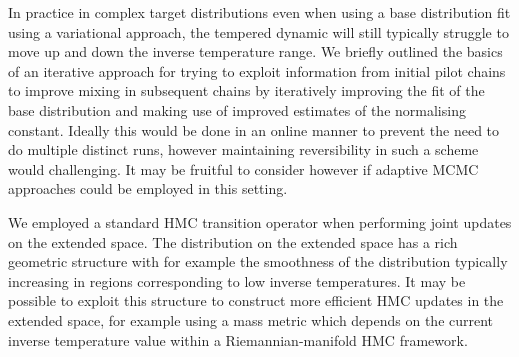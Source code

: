 In practice in complex target distributions even when using a base distribution fit using a variational approach, the tempered dynamic will still typically struggle to move up and down the inverse temperature range. We briefly outlined the basics of an iterative approach for trying to exploit information from initial pilot chains to improve mixing in subsequent chains by iteratively improving the fit of the base distribution and making use of improved estimates of the normalising constant. Ideally this would be done in an online manner to prevent the need to do multiple distinct runs, however maintaining reversibility in such a scheme would challenging. It may be fruitful to consider however if adaptive \ac{MCMC} approaches could be employed in this setting. 

We employed a standard \ac{HMC} transition operator when performing joint updates on the extended space. The distribution on the extended space has a rich geometric structure with for example the smoothness of the distribution typically increasing in regions corresponding to low inverse temperatures. It may be possible to exploit this structure to construct more efficient \ac{HMC} updates in the extended space, for example using a mass metric which depends on the current inverse temperature value within a Riemannian-manifold \ac{HMC} framework.

